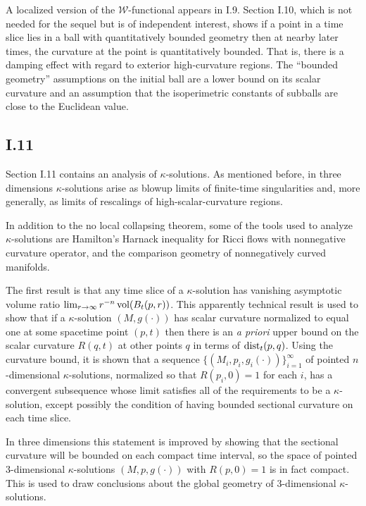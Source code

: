 A localized version of the ${\mathcal W}$-functional appears in I.9.
Section I.10,
which is not needed for the sequel
but is of independent
interest, shows if a point in a time slice
lies in a ball with quantitatively bounded geometry then
at nearby later times, the curvature at the point is quantitatively
bounded.  That is, there is a damping effect with regard to exterior high-curvature
regions. The ``bounded geometry'' assumptions on the initial
ball are a lower bound on its scalar curvature and an assumption that
the isoperimetric constants of subballs are close to the Euclidean
value.

\subsection{I.11}

Section I.11 contains an analysis of $\kappa$-solutions. As mentioned before, in
three dimensions $\kappa$-solutions arise as blowup limits of finite-time singularities and,
more generally, as limits of rescalings of high-scalar-curvature regions.

In addition to the no local collapsing theorem, some of the tools used to analyze
$\kappa$-solutions are Hamilton's Harnack inequality for Ricci flows with
nonnegative curvature operator, and the comparison geometry of
nonnegatively curved manifolds.

The first result is that any time slice of a $\kappa$-solution
has vanishing asymptotic volume ratio $\lim_{r \rightarrow \infty} r^{-n} \operatorname{vol}(B_t(p, r))$.
This apparently technical result is used to show that if a
$\kappa$-solution $(M, g(\cdot))$ has scalar curvature normalized to equal
one at some spacetime point $(p,t)$ then there is an {\it a priori} upper bound on
the scalar curvature $R(q,t)$ at other points $q$ in terms of $\operatorname{dist}_t(p,q)$.
Using the curvature
bound, it is shown that a sequence $\{(M_i, p_i, g_i(\cdot)) \}_{i=1}^\infty$ of pointed
$n$-dimensional $\kappa$-solutions, normalized so that $R(p_i, 0) =1$ for each $i$, has
a convergent subsequence whose limit satisfies all of the requirements to be a
$\kappa$-solution, except possibly the condition of having bounded
sectional curvature on each time slice.

In three dimensions this statement is improved by showing that
the sectional curvature will be bounded on
each
compact time interval,
so the space of pointed $3$-dimensional $\kappa$-solutions
$(M, p, g(\cdot))$ with $R(p,0) = 1$ is in fact compact.
This is used to draw conclusions about the global geometry of
$3$-dimensional $\kappa$-solutions.

